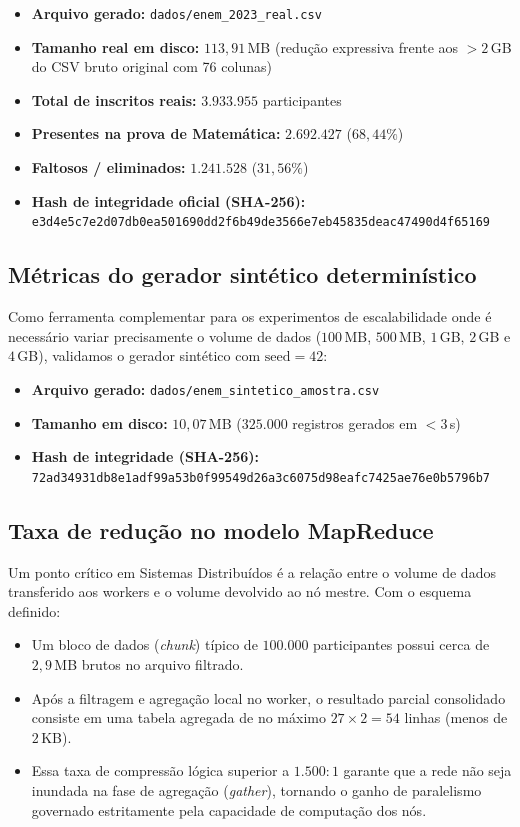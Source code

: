 \begin{itemize}
  \item \textbf{Arquivo gerado:} \texttt{dados/enem\_2023\_real.csv}
  \item \textbf{Tamanho real em disco:} $113{,}91$\,MB (redução expressiva frente aos $> 2$\,GB do CSV bruto original com 76 colunas)
  \item \textbf{Total de inscritos reais:} $3.933.955$ participantes
  \item \textbf{Presentes na prova de Matemática:} $2.692.427$ ($68{,}44\%$)
  \item \textbf{Faltosos / eliminados:} $1.241.528$ ($31{,}56\%$)
  \item \textbf{Hash de integridade oficial (SHA-256):}\\
    \texttt{\footnotesize e3d4e5c7e2d07db0ea501690dd2f6b49de3566e7eb45835deac47490d4f65169}
\end{itemize}

\subsection{Métricas do gerador sintético determinístico}
Como ferramenta complementar para os experimentos de escalabilidade onde é
necessário variar precisamente o volume de dados ($100$\,MB, $500$\,MB, $1$\,GB,
$2$\,GB e $4$\,GB), validamos o gerador sintético com $\text{seed}=42$:

\begin{itemize}
  \item \textbf{Arquivo gerado:} \texttt{dados/enem\_sintetico\_amostra.csv}
  \item \textbf{Tamanho em disco:} $10{,}07$\,MB ($325.000$ registros gerados em $< 3$\,s)
  \item \textbf{Hash de integridade (SHA-256):}\\
    \texttt{\footnotesize 72ad34931db8e1adf99a53b0f99549d26a3c6075d98eafc7425ae76e0b5796b7}
\end{itemize}

\subsection{Taxa de redução no modelo MapReduce}
Um ponto crítico em Sistemas Distribuídos é a relação entre o volume de dados
transferido aos workers e o volume devolvido ao nó mestre. Com o esquema
definido:
\begin{itemize}
  \item Um bloco de dados (\emph{chunk}) típico de $100.000$ participantes
    possui cerca de $2{,}9$\,MB brutos no arquivo filtrado.
  \item Após a filtragem e agregação local no worker, o resultado parcial
    consolidado consiste em uma tabela agregada de no máximo $27 \times 2 = 54$
    linhas (menos de $2$\,KB).
  \item Essa taxa de compressão lógica superior a $1.500:1$ garante que a rede
    não seja inundada na fase de agregação (\emph{gather}), tornando o ganho de
    paralelismo governado estritamente pela capacidade de computação dos nós.
\end{itemize}
